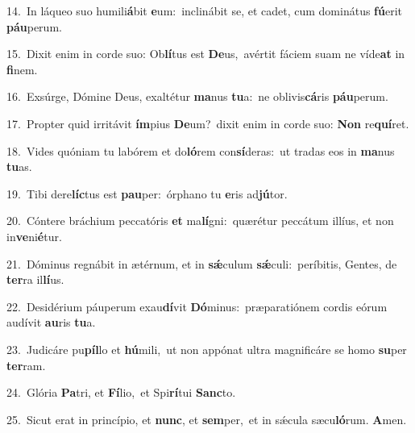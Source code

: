 {\numbfont\textcolor{\numbcolor}{14.}}~In láqueo suo humili\-\textbf{á}\-bit \textbf{e}\-um:~\star inclinábit se, et cadet, cum dominátus \textbf{fú}\-erit \textbf{páu}\-perum.\par
{\numbfont\textcolor{\numbcolor}{15.}}~Dixit enim in corde suo: Ob\-\textbf{lí}\-tus est \textbf{De}\-us,~\star avértit fáciem suam ne víde\textbf{at} in \textbf{fi}\-nem.\par
{\numbfont\textcolor{\numbcolor}{16.}}~Exsúrge, Dómine Deus, exaltétur \textbf{ma}\-nus \textbf{tu}\-a:~\star ne oblivis\-\textbf{cá}\-ris \textbf{páu}\-perum.\par
{\numbfont\textcolor{\numbcolor}{17.}}~Propter quid irritávit \textbf{ím}\-pius \textbf{De}\-um?~\star dixit enim in corde suo: \textbf{Non} re\-\textbf{quí}\-ret.\par
{\numbfont\textcolor{\numbcolor}{18.}}~Vides quóniam tu labórem et do\-\textbf{ló}\-rem con\-\textbf{sí}\-deras:~\star ut tradas eos in \textbf{ma}\-nus \textbf{tu}\-as.\par
{\numbfont\textcolor{\numbcolor}{19.}}~Tibi dere\-\textbf{líc}\-tus est \textbf{pau}\-per:~\star órphano tu \textbf{e}\-ris ad\-\textbf{jú}\-tor.\par
{\numbfont\textcolor{\numbcolor}{20.}}~Cóntere bráchium peccatóris \textbf{et} ma\-\textbf{lí}\-gni:~\star quærétur peccátum illíus, et non in\-\textbf{ve}\-ni\-\textbf{é}\-tur.\par
{\numbfont\textcolor{\numbcolor}{21.}}~Dóminus regnábit in ætérnum, et in \textbf{sǽ}\-culum \textbf{sǽ}\-culi:~\star períbitis, Gentes, de \textbf{ter}\-ra il\-\textbf{lí}\-us.\par
{\numbfont\textcolor{\numbcolor}{22.}}~Desidérium páuperum exau\-\textbf{dí}\-vit \textbf{Dó}\-minus:~\star præparatiónem cordis eórum audívit \textbf{au}\-ris \textbf{tu}\-a.\par
{\numbfont\textcolor{\numbcolor}{23.}}~Judicáre pu\-\textbf{píl}\-lo et \textbf{hú}\-mili,~\star ut non appónat ultra magnificáre se homo \textbf{su}\-per \textbf{ter}\-ram.\par
{\numbfont\textcolor{\numbcolor}{24.}}~Glória \textbf{Pa}\-tri, et \textbf{Fí}\-lio,~\star et Spi\-\textbf{rí}\-tui \textbf{Sanc}\-to.\par
{\numbfont\textcolor{\numbcolor}{25.}}~Sicut erat in princípio, et \textbf{nunc}\-, et \textbf{sem}\-per,~\star et in sǽcula sæcu\-\textbf{ló}\-rum. \textbf{A}\-men.\par
